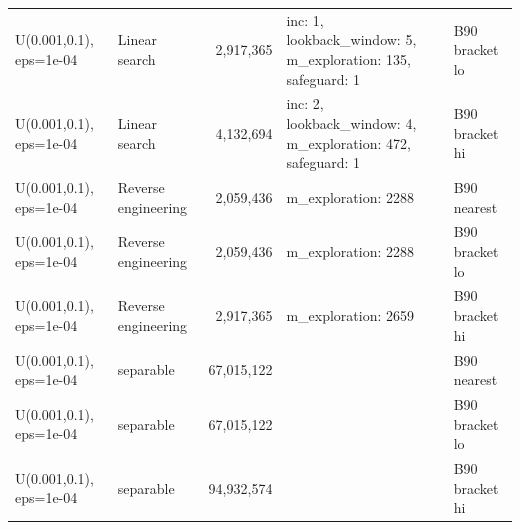 \begin{tabular}{llrll}
U(0.001,0.1), eps=1e-04 & Linear search & 2,917,365 & inc: 1, lookback\_window: 5, m\_exploration: 135, safeguard: 1 & B90 bracket lo \\
U(0.001,0.1), eps=1e-04 & Linear search & 4,132,694 & inc: 2, lookback\_window: 4, m\_exploration: 472, safeguard: 1 & B90 bracket hi \\
U(0.001,0.1), eps=1e-04 & Reverse engineering & 2,059,436 & m\_exploration: 2288 & B90 nearest \\
U(0.001,0.1), eps=1e-04 & Reverse engineering & 2,059,436 & m\_exploration: 2288 & B90 bracket lo \\
U(0.001,0.1), eps=1e-04 & Reverse engineering & 2,917,365 & m\_exploration: 2659 & B90 bracket hi \\
U(0.001,0.1), eps=1e-04 & separable & 67,015,122 &  & B90 nearest \\
U(0.001,0.1), eps=1e-04 & separable & 67,015,122 &  & B90 bracket lo \\
U(0.001,0.1), eps=1e-04 & separable & 94,932,574 &  & B90 bracket hi \\
\bottomrule
\end{tabular}
